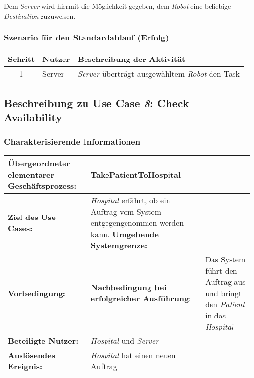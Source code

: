 			Dem \emph{Server} wird hiermit die Möglichkeit gegeben, dem \emph{Robot} eine beliebige \emph{Destination} zuzuweisen. 

			\subsubsection*{Szenario für den Standardablauf (Erfolg)}

			\begin{table}[H]
				\centering
				\begin{tabularx}{\textwidth}{@{}cp{2cm}X@{}}
				\hline
				Schritt & Nutzer & Beschreibung der Aktivität \\ \hline
				1 & Server & \emph{Server} überträgt ausgewähltem \emph{Robot} den Task \\
				\hline
				\end{tabularx}
			\end{table}


	\pagebreak


		\subsection{Beschreibung zu Use Case \emph{8}: Check Availability}

			\subsubsection*{Charakterisierende Informationen}

			\begin{table}[H]
				\centering
				\begin{tabularx}{\textwidth}{@{}p{5cm}X@{}}
				\hline
				\textbf{Übergeordneter elementarer Geschäftsprozess:} & TakePatientToHospital  \\ \hline
				\textbf{Ziel des Use Cases:} & \emph{Hospital} erfährt, ob ein Auftrag vom System entgegengenommen werden kann. \hline
				\textbf{Umgebende Systemgrenze:} &  \\ \hline
				\textbf{Vorbedingung:} &  \hline
				\textbf{Nachbedingung bei erfolgreicher Ausführung:} & Das System führt den Auftrag aus und bringt den \emph{Patient} in das \emph{Hospital} \\ \hline
				\textbf{Beteiligte Nutzer:} & \emph{Hospital} und \emph{Server}\\ \hline
				\textbf{Auslösendes Ereignis:} & \emph{Hospital} hat einen neuen Auftrag\\
				\hline
				\end{tabularx}
			\end{table}

